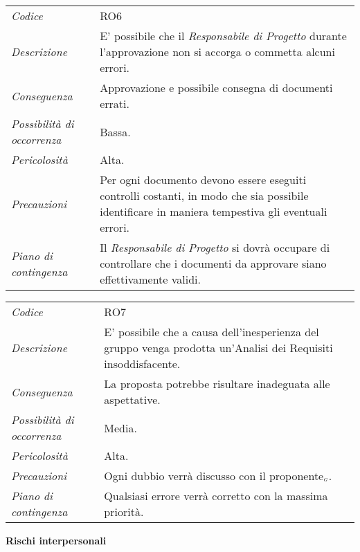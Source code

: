 {{{{{{{{{{	\begin{center}
		\renewcommand{\arraystretch}{1.4}
		\begin{longtable}{|p{5cm}|p{12cm}|}
			\hline
			\rowcolor{airforceblue}
			\multicolumn{2}{|c|}{\textit{Approvazione errata dei documenti}}\\
			\hline
			\textit{Codice} & RO6 \\
			\hline
			\textit{Descrizione} & E' possibile che il \textit{Responsabile di Progetto} durante l'approvazione non si accorga o commetta alcuni errori.\\
			\hline
			\textit{Conseguenza} & Approvazione e possibile consegna di documenti errati. \\
			\hline
			\textit{Possibilità di occorrenza} & Bassa. \\
			\hline
			\textit{Pericolosità} & Alta. \\
			\hline
			\textit{Precauzioni} & Per ogni documento devono essere eseguiti controlli costanti, in modo che sia possibile identificare in maniera tempestiva gli eventuali errori.  \\
			\hline
			\textit{Piano di contingenza} & Il \textit{Responsabile di Progetto} si dovrà occupare di controllare che i documenti da approvare siano effettivamente validi. \\
			\hline
		\end{longtable}
	\end{center}

\def\tabularxcolumn#1{m{#1}}
{
	
	\begin{center}
		\renewcommand{\arraystretch}{1.4}
		\begin{longtable}{|p{5cm}|p{12cm}|}
			\hline
			\rowcolor{airforceblue}
			\multicolumn{2}{|c|}{\textit{Analisi dei requisiti imperfetta}}\\
			\hline
			\textit{Codice} & RO7 \\
			\hline
			\textit{Descrizione} & E' possibile che a causa dell'inesperienza del gruppo venga prodotta un'Analisi dei Requisiti insoddisfacente.\\
			\hline
			\textit{Conseguenza} & La proposta potrebbe risultare inadeguata alle aspettative. \\
			\hline
			\textit{Possibilità di occorrenza} & Media. \\
			\hline
			\textit{Pericolosità} & Alta. \\
			\hline
			\textit{Precauzioni} & Ogni dubbio verrà discusso con il proponente$_{\scaleto{G}{3pt}}$.  \\
			\hline
			\textit{Piano di contingenza} & Qualsiasi errore verrà corretto con la massima priorità. \\
			\hline
		\end{longtable}
	\end{center}
\clearpage
\quad
\begin{center}
	\LARGE\textbf{Rischi interpersonali}
\end{center}

}}}}}}}}}}}
